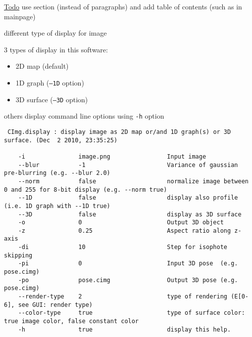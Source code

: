 \begin{Desc}
\item[\hyperlink{todo__todo000001}{Todo}]use section (instead of paragraphs) and add table of contents (such as in mainpage)\end{Desc}
\begin{Desc}
\item[different type of display for image]\end{Desc}
3 types of display in this software: \begin{itemize}
\item 2D map (default) \item 1D graph ({\tt --1D} option) \item 3D surface ({\tt --3D} option)\end{itemize}
others display command line options using {\tt -h} option 

\begin{VerbInclude}\begin{verbatim}
 CImg.display : display image as 2D map or/and 1D graph(s) or 3D surface. (Dec  2 2010, 23:35:25)

    -i               image.png                Input image
    --blur           -1                       Variance of gaussian pre-blurring (e.g. --blur 2.0)
    --norm           false                    normalize image between 0 and 255 for 8-bit display (e.g. --norm true)
    --1D             false                    display also profile (i.e. 1D graph with --1D true)
    --3D             false                    display as 3D surface
    -o               0                        Output 3D object
    -z               0.25                     Aspect ratio along z-axis
    -di              10                       Step for isophote skipping
    -pi              0                        Input 3D pose  (e.g. pose.cimg)
    -po              pose.cimg                Output 3D pose (e.g. pose.cimg)
    --render-type    2                        type of rendering (E[0-6], see GUI: render type)
    --color-type     true                     type of surface color: true image color, false constant color
    -h               true                     display this help.
\end{verbatim}
\end{VerbInclude}


